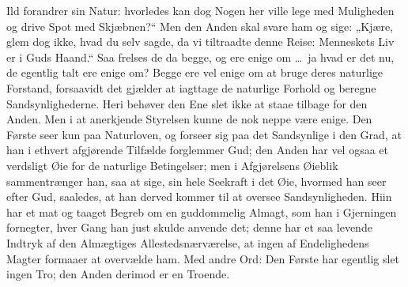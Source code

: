 \documentclass[12pt,a4paper]{book}
\begin{document}
Ild forandrer sin Natur: hvorledes kan dog Nogen
her ville lege med Muligheden og drive Spot med Skjæbnen?“ Men den Anden
skal svare ham og sige: „Kjære, glem dog ikke, hvad du selv sagde, da vi
tiltraadte denne Reise: Menneskets Liv er i Guds Haand.“ Saa frelses de
da begge, og ere enige om \dots\ ja hvad er det nu, de egentlig talt ere
enige om? Begge ere vel enige om at bruge deres naturlige Forstand,
forsaavidt det gjælder at iagttage de naturlige Forhold og beregne
Sandsynlighederne. Heri behøver den Ene slet ikke at staae tilbage for
den Anden. Men i at anerkjende Styrelsen kunne de nok neppe være enige.
Den Første seer kun paa Naturloven, og forseer sig paa det Sandsynlige i
den Grad, at han i ethvert afgjørende Tilfælde forglemmer Gud; den Anden
har vel ogsaa et verdsligt Øie for de naturlige Betingelser; men i
Afgjørelsens Øieblik sammentrænger han, saa at sige, sin hele Seekraft i
det Øie, hvormed han seer efter Gud, saaledes, at han derved kommer til
at oversee Sandsynligheden. Hiin har et mat og taaget Begreb om en
guddommelig Almagt, som han i Gjerningen fornegter, hver Gang han just
skulde anvende det; denne har et saa levende Indtryk af den Almægtiges
Allestedsnærværelse, at ingen af Endelighedens Magter formaaer at
overvælde ham. Med andre Ord: Den Første har egentlig slet ingen Tro; den
Anden derimod er en Troende.
\end{document}
